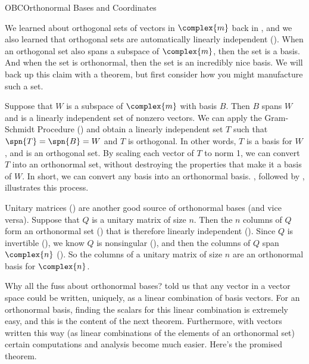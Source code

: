 \begin{subsect}{OBC}{Orthonormal Bases and Coordinates}
%
\begin{para}We learned about orthogonal sets of vectors in $\complex{m}$ back in , and we also learned that orthogonal sets are automatically linearly independent ().  When an orthogonal set also spans a subspace of $\complex{m}$, then the set is a basis.  And when the set is orthonormal, then the set is an incredibly nice basis.  We will back up this claim with a theorem, but first consider how you might manufacture such a set.\end{para}
%
\begin{para}Suppose that $W$ is a subspace of $\complex{m}$ with basis $B$.  Then $B$ spans $W$ and is a linearly independent set of nonzero vectors.  We can apply the Gram-Schmidt Procedure () and obtain a linearly independent set $T$ such that $\spn{T}=\spn{B}=W$ and $T$ is orthogonal.  In other words, $T$ is a basis for $W$, and is an orthogonal set.  By scaling each vector of $T$ to norm 1, we can convert $T$ into an orthonormal set, without destroying the properties that make it a basis of $W$.  In short, we can convert any basis into an orthonormal basis.  , followed by , illustrates this process.\end{para}
%
\begin{para}Unitary matrices () are another good source of orthonormal bases (and vice versa).  Suppose that $Q$ is a unitary matrix of size $n$.  Then the $n$ columns of $Q$ form an orthonormal set () that is therefore linearly independent ().  Since $Q$ is invertible (), we know $Q$ is nonsingular (), and then the columns of $Q$ span $\complex{n}$ ().  So the columns of a unitary matrix of size $n$ are an orthonormal basis for $\complex{n}$.\end{para}
%
\begin{para}Why all the fuss about orthonormal bases?   told us that any vector in a vector space could be written, uniquely, as a linear combination of basis vectors.  For an orthonormal basis, finding the scalars for this linear combination is extremely easy, and this is the content of the next theorem.  Furthermore, with vectors written this way (as linear combinations of the elements of an orthonormal set) certain computations and analysis become much easier.  Here's the promised theorem.\end{para}

\end{subsect}

